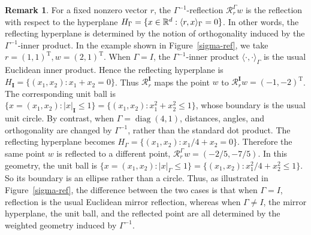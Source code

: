 \documentclass[aap]{imsart}
\theoremstyle{plain}
\theoremstyle{definition}
\newtheorem{remark}{Remark}
\begin{document}
\begin{remark}
	For a fixed nonzero vector \(r\), the \(\Gamma^{-1}\)-reflection \(\mathcal R_r^\Gamma w\)
	is the reflection with respect to the hyperplane \(H_\Gamma
	=
	\{x\in \mathbb{R}^d:\langle r,x\rangle_\Gamma=0\}\).
	In other words, the reflecting hyperplane is determined by the notion of
	orthogonality induced by the \(\Gamma^{-1}\)-inner product.
	In the example shown in Figure~\ref{sigma-ref}, we take \(	r=(1,1)^{\mathrm T},
	w=(2,1)^{\mathrm T}\).
	When \(\Gamma=I\), the \(\Gamma^{-1}\)-inner product \(\langle \cdot, \cdot\rangle_\Gamma\) is the usual Euclidean
	inner product. Hence the reflecting hyperplane is \(H_{\mathbf I}=\{(x_1,x_2):x_1+x_2=0\}\).
	Thus \(\mathcal R_r^{\mathbf I}\) maps the point \(w\) to \(\mathcal R_r^{\mathbf I} w=(-1,-2)^{\mathrm T}\).
	The corresponding unit ball is \(\{x = (x_1, x_2):|x|_{\mathbf I}\leqslant 1\}
	=
	\{(x_1,x_2):x_1^2+x_2^2\leqslant 1\}\),
	whose boundary is the usual unit circle. By contrast, when \(\Gamma=\operatorname{diag}(4,1)\),
	distances, angles, and orthogonality are changed by
	\(\Gamma^{-1}\), rather than the standard dot product. The reflecting hyperplane becomes \(H_\Gamma
	=
	\{(x_1,x_2): x_1/4+x_2=0\}\).
	Therefore the same point \(w\) is reflected to a different point, \(\mathcal R_r^\Gamma w
	=(-2/5,-7/5)\). In this geometry, the unit ball is \(\{x=(x_1, x_2):|x|_\Gamma\leqslant 1\}
	=
	\{(x_1, x_2):x_1^2/4+x_2^2\leqslant 1\}\). So its boundary is an ellipse rather than a circle. Thus, as illustrated in Figure~\ref{sigma-ref}, the difference
	between the two cases is that when \(\Gamma=I\), reflection is the usual
	Euclidean mirror reflection, whereas when \(\Gamma\neq I\), the mirror
	hyperplane, the unit ball, and the reflected point are all determined by
	the weighted geometry induced by \(\Gamma^{-1}\).
\end{remark}
\end{document}
